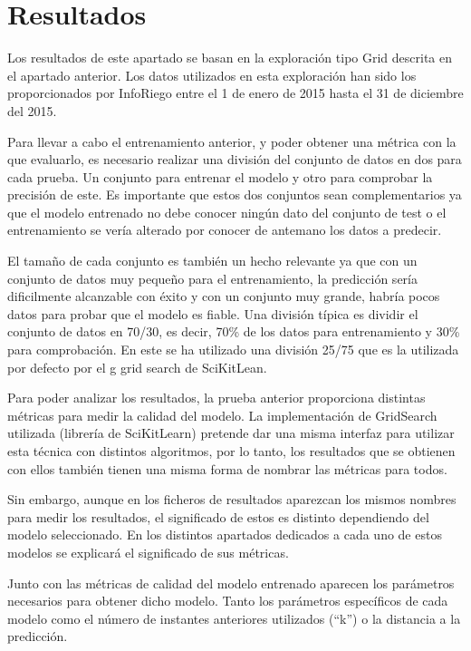 \cleardoublepage

\chapter{Resultados}
\label{makereference6}

Los resultados de este apartado se basan en la exploración tipo Grid descrita en el apartado anterior. Los datos utilizados en esta exploración han sido los proporcionados por InfoRiego entre el 1 de enero de 2015 hasta el 31 de diciembre del 2015.

Para llevar a cabo el entrenamiento anterior, y poder obtener una métrica con la que evaluarlo, es necesario realizar una división del conjunto de datos en dos para cada prueba. Un conjunto para entrenar el modelo y otro para comprobar la precisión de este. Es importante que estos dos conjuntos sean complementarios ya que el modelo entrenado no debe conocer ningún dato del conjunto de test o el entrenamiento se vería alterado por conocer de antemano los datos a predecir.

El tamaño de cada conjunto es también un hecho relevante ya que con un conjunto de datos muy pequeño para el entrenamiento, la predicción sería dificilmente alcanzable con éxito y con un conjunto muy grande, habría pocos datos para probar que el modelo es fiable. Una división típica es dividir el conjunto de datos en 70/30, es decir, 70\% de los datos para entrenamiento y 30\% para comprobación. En este se ha utilizado una división 25/75 que es la utilizada por defecto por el g grid search de SciKitLean.

Para poder analizar los resultados, la prueba anterior proporciona distintas métricas para medir la calidad del modelo. La implementación de GridSearch utilizada (librería de SciKitLearn) pretende dar una misma interfaz para utilizar esta técnica con distintos algoritmos, por lo tanto, los resultados que se obtienen con ellos también tienen una misma forma de nombrar las métricas para todos.

Sin embargo, aunque en los ficheros de resultados aparezcan los mismos nombres para medir los resultados, el significado de estos es distinto dependiendo del modelo seleccionado. En los distintos apartados dedicados a cada uno de estos modelos se explicará el significado de sus métricas.

Junto con las métricas de calidad del modelo entrenado aparecen los parámetros necesarios para obtener dicho modelo. Tanto los parámetros específicos de cada modelo como el número de instantes anteriores utilizados (``k'') o la distancia a la predicción.

